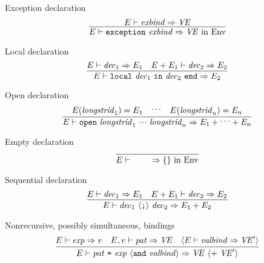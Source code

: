 \begin{inference-rule}{Exception declaration}
\begin{equation}\label{rule:dynamic-core:exception-declaration}
\vcenter{\infer{\E\ts\exceptiondec\ra\VE\ \In\ \Env }
  {\E\ts\exnbind\ra\VE }}
\end{equation}
\end{inference-rule}

\begin{inference-rule}{Local declaration}
\begin{equation}\label{rule:dynamic-core:local-declaration}
\vcenter{\infer{\E\ts\localdec\ra\E_{2}}
  {\E\ts\dec_{1}\ra\E_{1}
    & \E+\E_{1}\ts\dec_{2}\ra\E_{2}}}
\end{equation}
\end{inference-rule}

\begin{inference-rule}{Open declaration}
\begin{equation}\label{rule:dynamic-core:open-declaration}
\vcenter{\infer{ \E\ts\openstrdec\ra \E_{1} + \syndots + \E_{n} }
  { \E(\longstrid_{1})=\E_{1}
    &\syndots
    &\E(\longstrid_{n})=\E_{n} }}
\end{equation}
\end{inference-rule}

\begin{inference-rule}{Empty declaration}
\begin{equation}\label{rule:dynamic-core:empty-declaration}
\vcenter{\infer{\E\ts\emptydec\ra\emptymap\ \In\ \Env}
  {}}
\end{equation}
\end{inference-rule}

\begin{inference-rule}{Sequential declaration}
\begin{equation}\label{rule:dynamic-core:sequential-declaration}
\vcenter{\infer{\E\ts\seqdec\ra\plusmap{E_{1}}{E_{2}}}
  {\E\ts\dec_{1}\ra\E_{1}
    &\E+\E_{1}\ts\dec_{2}\ra\E_{2}}}
\end{equation}
\end{inference-rule}


\begin{inference-rule}{Nonrecursive, possibly simultaneous, bindings}
\begin{equation}\label{rule:dynamic-core:valbind1}
\vcenter{\infer{\E\ts\longvalbind\ra\VE\ \optional{ +\ \VE'}}
  {\E\ts\exp\ra\V
    & \E,\V\ts\pat\ra\VE
    & \optional{\E\ts\valbind\ra\VE'}}}
\end{equation}
\end{inference-rule}

